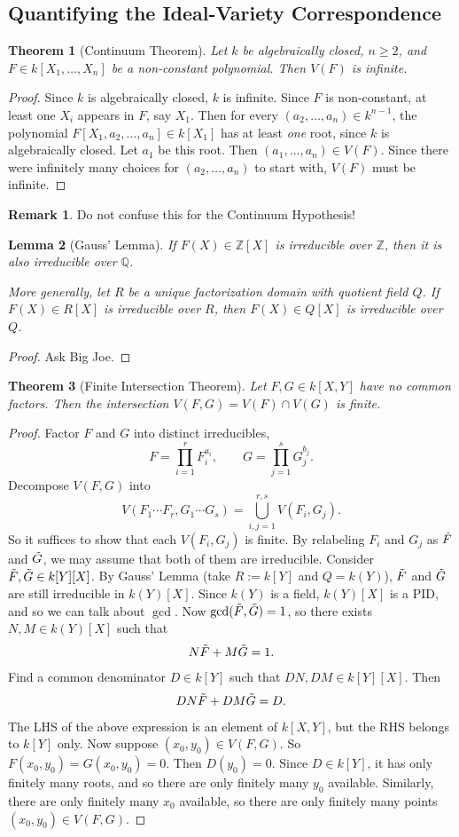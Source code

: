 \documentclass[12pt]{article}
\newcommand{\z}{\mathbb{Z}}
\newcommand{\q}{\mathbb{Q}}
\newcommand{\ita}[1]{\textit{#1}}
\newtheorem{theorem}{Theorem}[section]
\newtheorem{lemma}[theorem]{Lemma}
\theoremstyle{definition}
\newtheorem*{remark}{Remark}
\begin{document}
\subsection{Quantifying the Ideal-Variety Correspondence}
\begin{theorem}[Continuum Theorem]
    Let $k$ be algebraically closed, $n\geq2$, and $F\in k[X_1,\dotsc,X_n]$ be a non-constant polynomial. Then $V(F)$ is infinite.
\end{theorem}
\begin{proof}
    Since $k$ is algebraically closed, $k$ is infinite. Since $F$ is non-constant, at least one $X_i$ appears in $F$, say $X_1$. Then for every $(a_2,\dotsc,a_n)\in k^{n-1}$, the polynomial $F[X_1,a_2,\dotsc,a_n]\in k[X_1]$ has at least \ita{one} root, since $k$ is algebraically closed. Let $a_1$ be this root. Then $(a_1,\dotsc,a_n)\in V(F)$. Since there were infinitely many choices for $(a_2,\dotsc,a_n)$ to start with, $V(F)$ must be infinite.
\end{proof}
\begin{remark}
   Do not confuse this for the Continuum Hypothesis!
\end{remark}
\begin{lemma}[Gauss' Lemma]
    If $F(X)\in\z[X]$ is irreducible over $\z$, then it is also irreducible over $\q$.
    
    More generally, let $R$ be a unique factorization domain with quotient field $Q$. If $F(X)\in R[X]$ is irreducible over $R$, then $F(X)\in Q[X]$ is irreducible over $Q$.
\end{lemma}
\begin{proof}
    Ask Big Joe.
\end{proof}
\begin{theorem}[Finite Intersection Theorem]
    Let $F,G\in k[X,Y]$ have no common factors. Then the intersection $V(F,G)=V(F)\cap V(G)$ is finite.
\end{theorem}
\begin{proof}
    Factor $F$ and $G$ into distinct irreducibles,
    \[F=\prod\limits_{i=1}^rF_i^{a_i},\qquad G=\prod\limits_{j=1}^sG_j^{b_j}.\]
    Decompose $V(F,G)$ into
    \[V(F_1\dotsm F_r,G_1\dotsm G_s)=\bigcup\limits_{i,j=1}^{r,s}V(F_i,G_j).\]
    So it suffices to show that each $V(F_i,G_j)$ is finite. By relabeling $F_i$ and $G_j$ as $\Tilde{F}$ and $\Tilde{G}$, we may assume that both of them are irreducible. Consider $\Tilde{F},\Tilde{G}\in k[Y][X]$. By Gauss' Lemma (take $R:=k[Y]$ and $Q=k(Y)$), $\Tilde{F}$ and $\Tilde{G}$ are still irreducible in $k(Y)[X]$. Since $k(Y)$ is a field, $k(Y)[X]$ is a PID, and so we can talk about $\gcd$. Now $\gcd(\Tilde{F},\Tilde{G})=1$, so there exists $N,M\in k(Y)[X]$ such that
    \[N\Tilde{F}+M\Tilde{G}=1.\]
    Find a common denominator $D\in k[Y]$ such that $DN,DM\in k[Y][X]$. Then
    \[DN\Tilde{F}+DM\Tilde{G}=D.\]
    The LHS of the above expression is an element of $k[X,Y]$, but the RHS belongs to $k[Y]$ only. Now suppose $(x_0,y_0)\in V(F,G)$. So $F(x_0,y_0)=G(x_0,y_0)=0$. Then $D(y_0)=0$. Since $D\in k[Y]$, it has only finitely many roots, and so there are only finitely many $y_0$ available. Similarly, there are only finitely many $x_0$ available, so there are only finitely many points $(x_0,y_0)\in V(F,G)$.
\end{proof}
\end{document}
